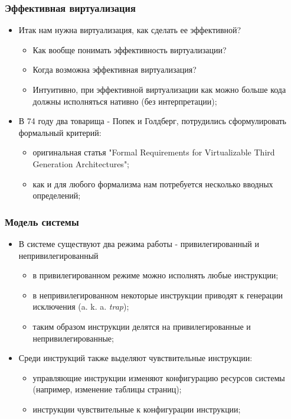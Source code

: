 \begin{frame}
\frametitle{Эффективная виртуализация}
\begin{itemize}
  \item<1-> Итак нам нужна виртуализация, как сделать ее эффективной?
    \begin{itemize}
      \item Как вообще понимать эффективность виртуализации?
      \item Когда возможна эффективная виртуализация?
      \item Интуитивно, при эффективной виртуализации как можно больше кода
            должны исполняться нативно (без интерпретации);
    \end{itemize}
  \item<2-> В 74 году два товарища - Попек и Голдберг, потрудились
        сформулировать формальный критерий:
    \begin{itemize}
      \item оригинальная статья "Formal Requirements for Virtualizable Third
            Generation Architectures";
      \item как и для любого формализма нам потребуется несколько вводных
            определений;
    \end{itemize}
\end{itemize}
\end{frame}

\begin{frame}
\frametitle{Модель системы}
\begin{itemize}
  \item<1-> В системе существуют два режима работы - привилегированный и
        непривилегированный
    \begin{itemize}
      \item в привилегированном режиме можно исполнять любые инструкции;
      \item в непривилегированном некоторые инструкции приводят к генерации
            исключения (a. k. a. \emph{trap});
      \item таким образом инструкции делятся на привилегированные и
            непривилегированные;
    \end{itemize}
  \item<2-> Среди инструкций также выделяют чувствительные инструкции:
    \begin{itemize}
      \item управляющие инструкции изменяют конфигурацию ресурсов системы
            (например, изменение таблицы страниц);
      \item инструкции чувствительные к конфигурации инструкции;
    \end{itemize}
\end{itemize}
\end{frame}

